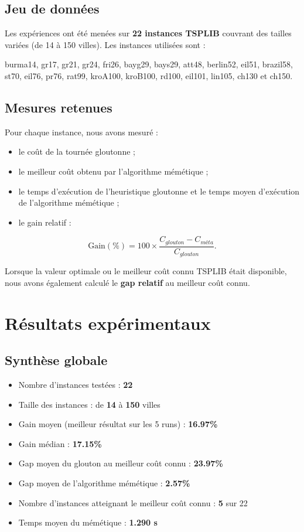 \documentclass[11pt,a4paper]{article}
\begin{document}
\subsection{Jeu de données}
Les expériences ont été menées sur \textbf{22 instances TSPLIB} couvrant des tailles variées (de 14 à 150 villes). Les instances utilisées sont :\par
\small burma14, gr17, gr21, gr24, fri26, bayg29, bays29, att48, berlin52, eil51, brazil58, st70, eil76, pr76, rat99, kroA100, kroB100, rd100, eil101, lin105, ch130 et ch150.\normalsize

\subsection{Mesures retenues}
Pour chaque instance, nous avons mesuré :
\begin{itemize}[leftmargin=1.2cm]
    \item le coût de la tournée gloutonne ;
    \item le meilleur coût obtenu par l'algorithme mémétique ;
    \item le temps d'exécution de l'heuristique gloutonne et le temps moyen d'exécution de l'algorithme mémétique ;
    \item le gain relatif :
\end{itemize}

\[
\text{Gain}(\%) = 100 \times \frac{C_{glouton} - C_{méta}}{C_{glouton}}.
\]

Lorsque la valeur optimale ou le meilleur coût connu TSPLIB était disponible, nous avons également calculé le \textbf{gap relatif} au meilleur coût connu.

\section{Résultats expérimentaux}

\subsection{Synthèse globale}
\begin{tcolorbox}[colback=softBlue,colframe=umiBlue,title=Indicateurs globaux]
\begin{itemize}[leftmargin=1.1cm]
    \item Nombre d'instances testées : \textbf{22}
    \item Taille des instances : de \textbf{14} à \textbf{150} villes
    \item Gain moyen (meilleur résultat sur les 5 runs) : \textbf{16.97\%}
    \item Gain médian : \textbf{17.15\%}
    \item Gap moyen du glouton au meilleur coût connu : \textbf{23.97\%}
    \item Gap moyen de l'algorithme mémétique : \textbf{2.57\%}
    \item Nombre d'instances atteignant le meilleur coût connu : \textbf{5} sur 22
    \item Temps moyen du mémétique : \textbf{1.290 s}
\end{itemize}
\end{tcolorbox}
\end{document}
